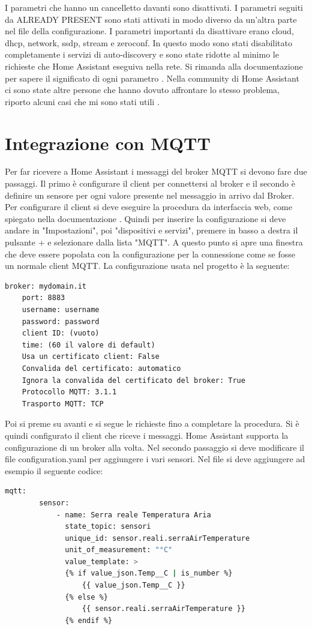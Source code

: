 I parametri che hanno un cancelletto davanti sono disattivati.
I parametri seguiti da ALREADY PRESENT 
sono stati attivati in modo diverso da un'altra parte nel file della configurazione.
I parametri importanti da disattivare erano cloud, dhcp, network, ssdp, stream e zeroconf.
In questo modo sono stati disabilitato completamente i servizi di auto-discovery 
e sono state ridotte al minimo le richieste che Home Assistant eseguiva nella rete.
Si rimanda alla documentazione per sapere il significato di ogni parametro \cite{hass-config}.
Nella community di Home Assistant ci sono state altre persone 
che hanno dovuto affrontare lo stesso problema, 
riporto alcuni casi che mi sono stati utili \cite{hass-config-community1} \cite{hass-config-comumnity2}.

\section{Integrazione con MQTT}
\label{sec:hass-MQTT}
Per far ricevere a Home Assistant i messaggi del broker MQTT si devono fare due passaggi.
Il primo è configurare il client per connettersi al broker 
e il secondo è definire un sensore per ogni valore presente nel messaggio in arrivo dal Broker.
Per configurare il client si deve eseguire la procedura da interfaccia web, 
come spiegato nella documentazione \cite{hass-mqtt}.
Quindi per inserire la configurazione si deve andare in "Impostazioni", poi "dispositivi e servizi",
premere in basso a destra il pulsante + e selezionare dalla lista "MQTT".
A questo punto si apre una finestra che deve essere popolata con la configurazione per la connessione
come se fosse un normale client MQTT.
La configurazione usata nel progetto è la seguente:
\begin{lstlisting}[language=textnonum]
    broker: mydomain.it
    port: 8883
    username: username
    password: password
    client ID: (vuoto)
    time: (60 il valore di default)
    Usa un certificato client: False
    Convalida del certificato: automatico
    Ignora la convalida del certificato del broker: True
    Protocollo MQTT: 3.1.1
    Trasporto MQTT: TCP
\end{lstlisting}
Poi si preme su avanti e si segue le richieste fino a completare la procedura.
Si è quindi configurato il client che riceve i messaggi.
Home Assistant supporta la configurazione di un broker alla volta.
Nel secondo passaggio si deve modificare il file configuration.yaml per aggiungere i vari sensori.
Nel file si deve aggiungere ad esempio il seguente codice:
\begin{lstlisting}[language=bash]
    mqtt:
        sensor:
            - name: Serra reale Temperatura Aria
              state_topic: sensori
              unique_id: sensor.reali.serraAirTemperature
              unit_of_measurement: "°C"
              value_template: >
              {% if value_json.Temp__C | is_number %}
                  {{ value_json.Temp__C }}
              {% else %}
                  {{ sensor.reali.serraAirTemperature }}
              {% endif %}
\end{lstlisting}
